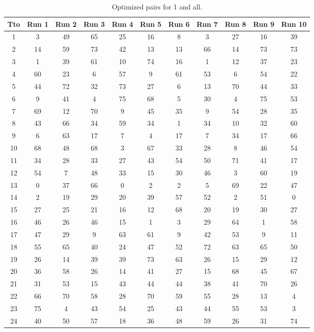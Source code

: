 \begin{table}
  \centering
  \scriptsize
  \caption{Optimized pairs for 1 and all.}
  \label{tab_pairs}
\begin{tabular}{c c c c c c c c c c c }
\hline
Tto & Run 1 & Run 2 & Run 3 & Run 4 & Run 5 & Run 6 & Run 7 & Run 8 & Run 9 & Run 10 \\
\hline
1 & 3 & 49 & 65 & 25 & 16 & 8 & 3 & 27 & 16 & 39 \\
2 & 14 & 59 & 73 & 42 & 13 & 13 & 66 & 14 & 73 & 73 \\
3 & 1 & 39 & 61 & 10 & 74 & 16 & 1 & 12 & 37 & 23 \\
4 & 60 & 23 & 6 & 57 & 9 & 61 & 53 & 6 & 54 & 22 \\
5 & 44 & 72 & 32 & 73 & 27 & 6 & 13 & 70 & 44 & 33 \\
6 & 9 & 41 & 4 & 75 & 68 & 5 & 30 & 4 & 75 & 53 \\
7 & 69 & 12 & 70 & 9 & 45 & 35 & 9 & 54 & 28 & 35 \\
8 & 43 & 66 & 34 & 59 & 34 & 1 & 34 & 10 & 32 & 60 \\
9 & 6 & 63 & 17 & 7 & 4 & 17 & 7 & 34 & 17 & 66 \\
10 & 68 & 48 & 68 & 3 & 67 & 33 & 28 & 8 & 46 & 54 \\
11 & 34 & 28 & 33 & 27 & 43 & 54 & 50 & 71 & 41 & 17 \\
12 & 54 & 7 & 48 & 33 & 15 & 30 & 46 & 3 & 60 & 19 \\
13 & 0 & 37 & 66 & 0 & 2 & 2 & 5 & 69 & 22 & 47 \\
14 & 2 & 19 & 29 & 20 & 39 & 57 & 52 & 2 & 51 & 0 \\
15 & 27 & 25 & 21 & 16 & 12 & 68 & 20 & 19 & 30 & 27 \\
16 & 46 & 26 & 46 & 15 & 1 & 3 & 29 & 64 & 1 & 58 \\
17 & 47 & 29 & 9 & 63 & 61 & 9 & 42 & 53 & 9 & 11 \\
18 & 55 & 65 & 40 & 24 & 47 & 52 & 72 & 63 & 65 & 50 \\
19 & 26 & 14 & 39 & 39 & 73 & 63 & 26 & 15 & 29 & 12 \\
20 & 36 & 58 & 26 & 14 & 41 & 27 & 15 & 68 & 45 & 67 \\
21 & 31 & 53 & 15 & 43 & 44 & 44 & 38 & 41 & 70 & 26 \\
22 & 66 & 70 & 58 & 28 & 70 & 59 & 55 & 28 & 13 & 4 \\
23 & 75 & 4 & 43 & 54 & 25 & 43 & 44 & 55 & 53 & 3 \\
24 & 40 & 50 & 57 & 18 & 36 & 48 & 59 & 26 & 31 & 74 \\

\end{tabular}
\end{table}
